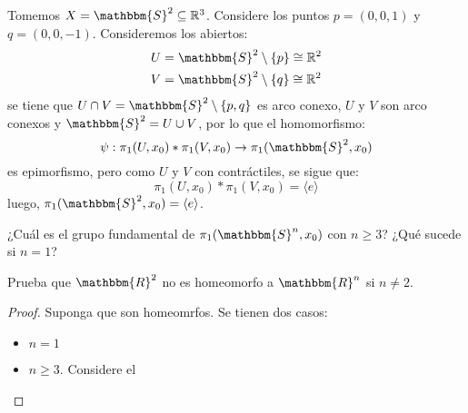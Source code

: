 \documentclass[12pt]{report}
\newcounter{it}
\theoremstyle{largebreak}
\newcommand\cf[3]{\ensuremath{#1:#2\rightarrow#3}}
\newcommand{\bbm}[1]{\ensuremath{\mathbbm{#1}}}
\newcommand{\gen}[1]{\ensuremath{\langle#1\rangle}}
\begin{document}
    \begin{exa}
        Tomemos $X=\bbm{S}^2\subseteq\mathbb{R}^3$. Considere los puntos $p=(0,0,1)$ y $q=(0,0,-1)$. Consideremos los abiertos:
        \begin{equation*}
            \begin{split}
                U&=\bbm{S}^2\setminus\left\{ p\right\}\cong\mathbb{R}^2\\
                V&=\bbm{S}^2\setminus\left\{ q\right\}\cong\mathbb{R}^2\\
            \end{split}
        \end{equation*}
        se tiene que $U\cap V=\bbm{S}^2\setminus\left\{p,q\right\}$ es arco conexo, $U$ y $V$ son arco conexos y $\bbm{S}^2=U\cup V$, por lo que el homomorfismo:
        \begin{equation*}
            \cf{\psi}{\pi_1(U,x_0)*\pi_1(V,x_0)}{\pi_1(\bbm{S}^2,x_0)}
        \end{equation*}
        es epimorfismo, pero como $U$ y $V$ con contráctiles, se sigue que:
        \begin{equation*}
            \pi_1(U,x_0)*\pi_1(V,x_0)=\gen{e}
        \end{equation*}
        luego, $\pi_1(\bbm{S}^2,x_0)=\gen{e}$.
    \end{exa}

    \begin{excer}
        ¿Cuál es el grupo fundamental de $\pi_1(\bbm{S}^n,x_0)$ con $n\geq 3$? ¿Qué sucede si $n=1$?
    \end{excer}

    \begin{excer}
        Prueba que $\bbm{R}^2$ no es homeomorfo a $\bbm{R}^n$ si $n\neq 2$.
    \end{excer}

    \begin{proof}
        Suponga que son homeomrfos. Se tienen dos casos:
        \begin{itemize}
            \item $n=1$
            \item $n\geq3$. Considere el 
        \end{itemize}
    \end{proof}
\end{document}
